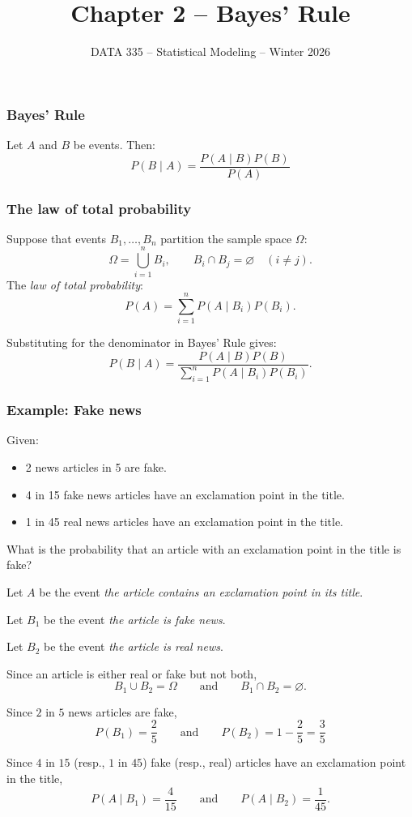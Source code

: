 \documentclass{beamer}
\title{Chapter 2 -- Bayes' Rule}
\date{DATA 335 -- Statistical Modeling -- Winter 2026}
\begin{document}
\frame{\titlepage}

\begin{frame}
    \frametitle{Bayes' Rule}
    Let $A$ and $B$ be events. Then:
    \[
    P(B\mid A) = \frac{P(A\mid B)P(B)}{P(A)}
    \]
\end{frame}

\begin{frame}
    \frametitle{The law of total probability}
    Suppose that events $B_1,\ldots,B_n$ partition the sample space $\Omega$:
    \[
    \Omega = \bigcup_{i=1}^n B_i,\qquad B_i\cap B_j=\varnothing\quad(i\neq j).
    \]
    The \emph{law of total probability}:
    \[
    P(A) = \sum_{i=1}^n P(A\mid B_i)P(B_i).
    \]
    
    Substituting for the denominator in Bayes' Rule gives:
    \[
    P(B\mid A) = \frac{P(A\mid B)P(B)}{\displaystyle\sum_{i=1}^n P(A\mid B_i)P(B_i)}.
    \]
\end{frame}

\begin{frame}
    \setlength\parskip{1em}
    \frametitle{Example: Fake news}
    Given:
    \begin{itemize}
        \setlength\itemsep{1em}
        \item 2 news articles in 5 are fake.
        \item 4 in 15 fake news articles have an exclamation point in the title.
        \item 1 in 45 real news articles have an exclamation point in the title.
    \end{itemize}
    What is the probability that an article with an exclamation point
    in the title is fake?
    
\end{frame}


\begin{frame}
    \setlength\parskip{1em}
    Let $A$ be the event \textit{the article contains an exclamation point in its title}.

    Let $B_1$ be the event \textit{the article is fake news}.

    Let $B_2$ be the event \textit{the article is real news}.

    Since an article is either real or fake but not both,
    $$
    B_1\cup B_2 = \Omega\qquad\text{and}\qquad
    B_1\cap B_2 = \varnothing.
    $$
\end{frame}
    
\begin{frame}
    Since $2$ in $5$ news articles are fake,
    $$
    P(B_1) = \frac25\qquad\text{and}\qquad P(B_2) = 1 - \frac25 = \frac35
    $$

    Since $4$ in $15$ (resp., $1$ in $45$) fake (resp., real) articles
    have an exclamation point in the title,
    \[
    P(A\mid B_1) = \frac{4}{15}\qquad\text{and}\qquad
    P(A\mid B_2) = \frac{1}{45}.
    \]
\end{frame}
\end{document}
